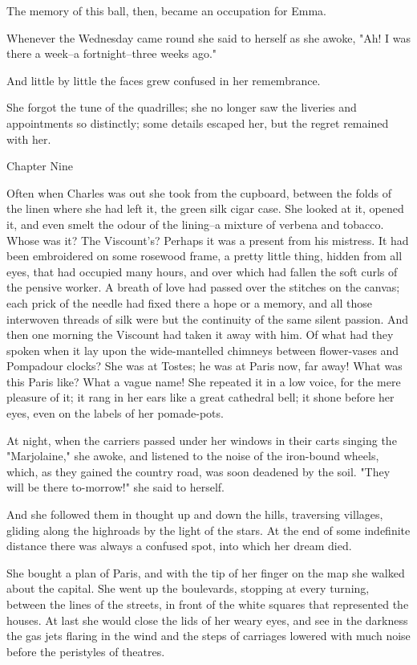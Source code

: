 \documentclass{tufte-book}
\begin{document}
The memory of this ball, then, became an occupation for Emma.

Whenever the Wednesday came round she said to herself as she awoke, "Ah!
I was there a week--a fortnight--three weeks ago."

And little by little the faces grew confused in her remembrance.

She forgot the tune of the quadrilles; she no longer saw the liveries
and appointments so distinctly; some details escaped her, but the regret
remained with her.



Chapter Nine

Often when Charles was out she took from the cupboard, between the
folds of the linen where she had left it, the green silk cigar case.
She looked at it, opened it, and even smelt the odour of the lining--a
mixture of verbena and tobacco. Whose was it? The Viscount's? Perhaps
it was a present from his mistress. It had been embroidered on some
rosewood frame, a pretty little thing, hidden from all eyes, that had
occupied many hours, and over which had fallen the soft curls of the
pensive worker. A breath of love had passed over the stitches on the
canvas; each prick of the needle had fixed there a hope or a memory, and
all those interwoven threads of silk were but the continuity of the same
silent passion. And then one morning the Viscount had taken it away
with him. Of what had they spoken when it lay upon the wide-mantelled
chimneys between flower-vases and Pompadour clocks? She was at Tostes;
he was at Paris now, far away! What was this Paris like? What a vague
name! She repeated it in a low voice, for the mere pleasure of it; it
rang in her ears like a great cathedral bell; it shone before her eyes,
even on the labels of her pomade-pots.

At night, when the carriers passed under her windows in their carts
singing the "Marjolaine," she awoke, and listened to the noise of the
iron-bound wheels, which, as they gained the country road, was soon
deadened by the soil. "They will be there to-morrow!" she said to
herself.

And she followed them in thought up and down the hills, traversing
villages, gliding along the highroads by the light of the stars. At the
end of some indefinite distance there was always a confused spot, into
which her dream died.

She bought a plan of Paris, and with the tip of her finger on the map
she walked about the capital. She went up the boulevards, stopping at
every turning, between the lines of the streets, in front of the white
squares that represented the houses. At last she would close the lids of
her weary eyes, and see in the darkness the gas jets flaring in the wind
and the steps of carriages lowered with much noise before the peristyles
of theatres.
\end{document}
